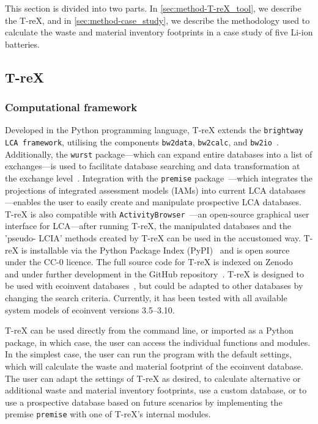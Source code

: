 This section is divided into two parts. In \autoref{sec:method-T-reX_tool}, we describe the T-reX, and in \autoref{sec:method-case_study}, we describe the methodology used to calculate the waste and material inventory footprints in a case study of five Li-ion batteries.

\subsection{T-reX}\label{sec:method-T-reX_tool}

\subsubsection{Computational framework}

Developed in the Python programming language, T-reX extends the \texttt{brightway LCA framework}, utilising the components \texttt{bw2data}, \texttt{bw2calc}, and \texttt{bw2io}~\citep{mutel2017brightway}. Additionally, the \texttt{wurst} package---which can expand entire databases into a list of exchanges---is used to facilitate database searching and data transformation at the exchange level~\citep{mutel2017wurst}. Integration with the \texttt{premise} package~\citep{sacchi2022premise}---which integrates the projections of integrated assessment models (IAMs) into current LCA databases---enables the user to easily create and manipulate prospective LCA databases. T-reX is also compatible with \texttt{ActivityBrowser}~\citep{steubing2020activitybrowser}---an open-source graphical user interface for LCA---after running T-reX, the manipulated databases and the 'pseudo- LCIA' methods created by T-reX can be used in the accustomed way. T-reX is installable via the Python Package Index (PyPI)~\citep{mcdowall2023T-reXpipy} and is open source under the CC-0 licence. The full source code for T-reX is indexed on Zenodo~\citep{mcdowall2023T-reXzenodo} and under further development in the GitHub repository~\citep{mcdowall2024T-reXgithub}. T-reX is designed to be used with ecoinvent databases~\citep{ecoinvent2016version3}, but could be adapted to other databases by changing the search criteria. Currently, it has been tested with all available system models of ecoinvent versions 3.5--3.10.

T-reX can be used directly from the command line, or imported as a Python package, in which case, the user can access the individual functions and modules. In the simplest case, the user can run the program with the default settings, which will calculate the waste and material footprint of the ecoinvent database. The user can adapt the settings of T-reX as desired, to calculate alternative or additional waste and material inventory footprints, use a custom database, or to use a prospective database based on future scenarios by implementing the premise \texttt{premise} with one of T-reX's internal modules.

